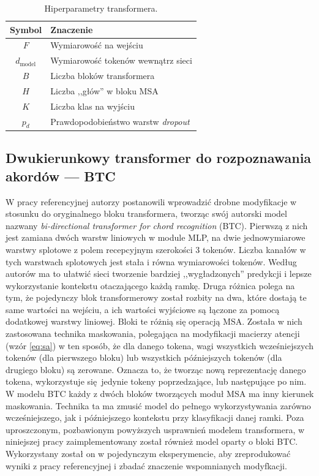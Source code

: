 \begin{table}
    \centering
    \caption{Hiperparametry transformera.}
    \label{tab:transformer_params}
    \begin{tabular}{|c|l|} \hline
        Symbol & Znaczenie \\ \hline
        $F$ & Wymiarowość na wejściu \\
        $d_{\mathrm{model}}$ & Wymiarowość tokenów wewnątrz sieci \\
        $B$ & Liczba bloków transformera \\
        $H$ & Liczba ,,głów'' w bloku MSA \\
        $K$ & Liczba klas na wyjściu \\
        $p_d$ & Prawdopodobieństwo warstw \emph{dropout} \\ \hline
    \end{tabular}
\end{table}

\subsection{Dwukierunkowy transformer do rozpoznawania akordów --- BTC}

W pracy referencyjnej \cite{park_bi-directional_2019} autorzy postanowili wprowadzić drobne modyfikacje w stosunku do oryginalnego bloku transformera, tworząc swój autorski model nazwany \emph{bi-directional transformer for chord recognition} (BTC). Pierwszą z nich jest zamiana dwóch warstw liniowych w module MLP, na dwie jednowymiarowe warstwy splotowe z polem recepcyjnym szerokości 3 tokenów. Liczba kanałów w tych warstwach splotowych jest stała i równa wymiarowości tokenów. Według autorów ma to ułatwić sieci tworzenie bardziej ,,wygładzonych'' predykcji i lepsze wykorzystanie kontekstu otaczającego każdą ramkę. Druga różnica polega na tym, że pojedynczy blok transformerowy został rozbity na dwa, które dostają te same wartości na wejściu, a ich wartości wyjściowe są łączone za pomocą dodatkowej warstwy liniowej. Bloki te różnią się operacją MSA.  Została w nich zastosowana technika maskowania, polegająca na modyfikacji macierzy atencji (wzór \ref{eq:sa}) w ten sposób, że dla danego tokena, wagi wszystkich wcześniejszych tokenów (dla pierwszego bloku) lub wszystkich późniejszych tokenów (dla drugiego bloku) są zerowane. Oznacza to, że tworząc nową reprezentację danego tokena, wykorzystuje się jedynie tokeny poprzedzające, lub następujące po nim. W modelu BTC każdy z dwóch bloków tworzących moduł MSA ma inny kierunek maskowania. Technika ta ma zmusić model do pełnego wykorzystywania zarówno wcześniejszego, jak i późniejszego kontekstu przy klasyfikacji danej ramki. Poza uproszczonym, pozbawionym powyższych usprawnień modelem transformera, w niniejszej pracy zaimplementowany został również model oparty o bloki BTC. Wykorzystany został on w pojedynczym eksperymencie, aby zreprodukować wyniki z pracy referencyjnej i zbadać znaczenie wspomnianych modyfkacji.



